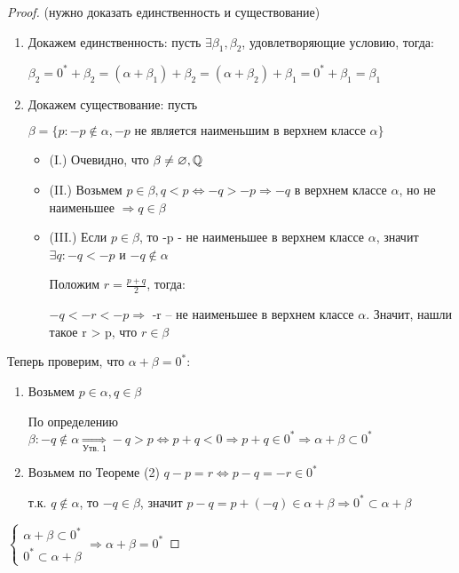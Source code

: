 \begin{proof} (нужно доказать единственность и существование)
    \begin{enumerate}
        \item Докажем единственность: пусть $\exists \beta_1, \beta_2$, удовлетворяющие условию, тогда:
        
        $\beta_2 = 0^* + \beta_2 = (\alpha + \beta_1) + \beta_2 = (\alpha + \beta_2) + \beta_1 = 0^* + \beta_1 = \beta_1$
        \item Докажем существование: пусть 
        
        $\beta = \{p: -p \notin \alpha, -p \text{ не является наименьшим в верхнем классе }\alpha\}$
        \begin{itemize}
            \item (I.) Очевидно, что $\beta \neq \varnothing, \mathbb{Q}$
            \item (II.) Возьмем $p \in \beta, q < p \Leftrightarrow -q > -p \Rightarrow -q$ в верхнем классе $\alpha$, но не наименьшее $\Rightarrow q \in \beta$
            \item (III.) Если $p \in \beta$, то -p - не наименьшее в верхнем классе $\alpha$, значит $\exists q: -q < -p$ и $-q \notin \alpha$
            
            Положим $r = \frac{p+q}{2}$, тогда:

            $-q < -r < -p \Rightarrow$ -r -- не наименьшее в верхнем классе $\alpha$. Значит, нашли такое r > p, что $r \in \beta$
        \end{itemize}
    \end{enumerate}

    Теперь проверим, что $\alpha + \beta = 0^*$:

    \begin{enumerate}
        \item Возьмем $p \in \alpha, q \in \beta$

        По определению $\beta: -q \notin \alpha \underset{\text{Утв. 1}}{\Rightarrow} -q > p \Leftrightarrow p + q < 0 \Rightarrow p + q \in 0^* \Rightarrow \alpha + \beta \subset 0^*$ 
        \item Возьмем по Теореме (2) $q - p = r \Leftrightarrow p - q = -r \in 0^*$
        
        т.к. $q \notin \alpha$, то $-q \in \beta$, значит $p - q = p + (-q) \in \alpha + \beta \Rightarrow 0^* \subset \alpha + \beta$
    \end{enumerate}
    
    $\begin{cases}
        \alpha + \beta \subset  0^* \\
        0^* \subset \alpha + \beta
    \end{cases} \Rightarrow \alpha  + \beta = 0^*$
\end{proof}